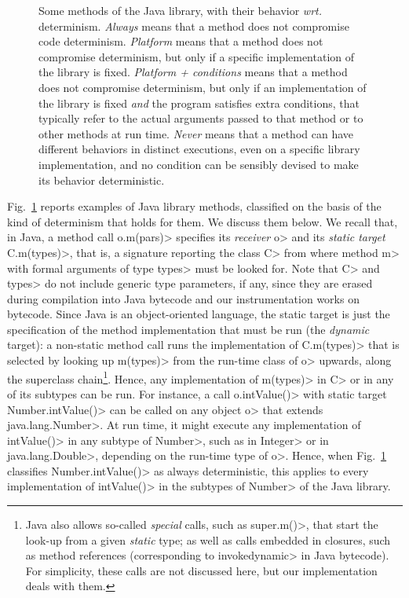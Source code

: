 \begin{figure}[t]
\begin{center}
{\begin{tabular}{|l||C{1cm}|C{1.25cm}|C{1.57cm}|C{1cm}|}
    \end{tabular}}
  \end{center}
  \caption{Some methods of the Java library, with their behavior \emph{wrt.} determinism.
\emph{Always} means that a method does not compromise code determinism.
\emph{Platform} means that
a method does not compromise determinism, but only if a specific implementation
of the library is fixed. \emph{Platform + conditions} means that a method
does not compromise determinism, but only if an implementation of the library is fixed
\emph{and} the program satisfies extra conditions, that typically refer to
the actual arguments passed to that method or to other methods at run time.
\emph{Never} means
that a method can have different behaviors in distinct executions,
even on a specific library implementation, and no
condition can be sensibly devised to make its behavior deterministic.}\label{fig:determinism}
\end{figure}

Fig.~\ref{fig:determinism} reports examples of Java library methods, classified
on the basis of the kind of determinism that holds for them.
We discuss them below. We recall that, in Java, a method call
\<o.m(pars)> specifies its \emph{receiver} \<o> and
its \emph{static target} \<C.m(types)>, that is, a signature
reporting the class \<C> from where method \<m> with formal
arguments of type \<types> must be looked for.
Note that \<C> and \<types> do not include generic type parameters, if any, since
they are erased during compilation into Java bytecode and our
instrumentation works on bytecode.
Since Java is an object-oriented language, the static target is just the specification
of the method implementation that must be run (the \emph{dynamic} target):
a non-static method call runs the implementation of \<C.m(types)>
that is selected by looking up \<m(types)> from the run-time class of \<o> upwards,
along the superclass chain\footnote{Java also allows so-called \emph{special} calls, such as
   \<super.m()>, that start the look-up from a given \emph{static}
   type; as well as calls embedded in closures, such as method references
   (corresponding to \<invokedynamic> in Java bytecode). For simplicity,
   these calls are not discussed here, but our implementation deals with them.}.
Hence, any implementation of \<m(types)> in \<C> or in any of its
subtypes can be run. For instance, a call \<o.intValue()> with static target \<Number.intValue()>
can be called on any object \<o> that extends
\<java.lang.Number>. At run time, it might
execute any implementation of \<intValue()> in any subtype of \<Number>,
such as in \<Integer> or in \<java.lang.Double>, depending on the run-time type of \<o>.
Hence, when Fig.~\ref{fig:determinism} classifies \<Number.intValue()> as always
deterministic, this applies to every implementation of
\<intValue()> in the subtypes of \<Number> of the Java library.

